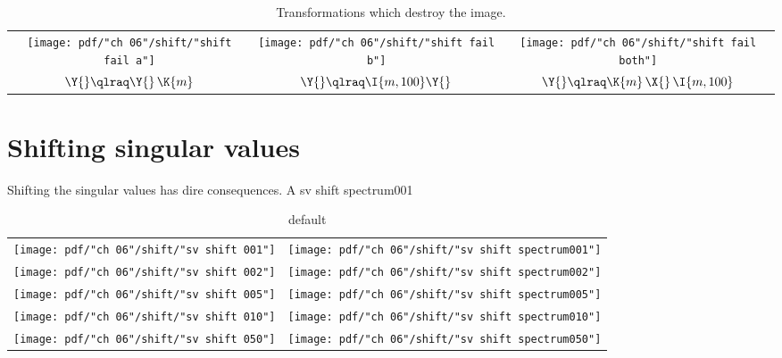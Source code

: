 \clearpage
\break

\begin{landscape}
\thispagestyle{empty}
\begin{table}[htdp]
\begin{center}
\begin{tabular}{ccc}
\texttt{[image: pdf/"ch 06"/shift/"shift fail a"]} &
\texttt{[image: pdf/"ch 06"/shift/"shift fail b"]} &
\texttt{[image: pdf/"ch 06"/shift/"shift fail both"]} \\
$\Y{} \qlraq \Y{}\,\K{m}$ &
$\Y{} \qlraq \I{m,100}\Y{}$ &
$\Y{} \qlraq \K{m}\,\X{}\,\I{m,100}$\\[5pt]
\end{tabular}
\end{center}
\label{tab:Jordan:shift:fail}
\caption[Transformations which destroy the image]{Transformations which destroy the image.}
\end{table}%
\end{landscape}

\section{Shifting singular values}
Shifting the singular values has dire consequences. A 
sv shift spectrum001

\begin{table}[htdp]
\begin{center}
\begin{tabular}{cc}
\texttt{[image: pdf/"ch 06"/shift/"sv shift 001"]} &
\texttt{[image: pdf/"ch 06"/shift/"sv shift spectrum001"]} \\
\texttt{[image: pdf/"ch 06"/shift/"sv shift 002"]} &
\texttt{[image: pdf/"ch 06"/shift/"sv shift spectrum002"]} \\
\texttt{[image: pdf/"ch 06"/shift/"sv shift 005"]} &
\texttt{[image: pdf/"ch 06"/shift/"sv shift spectrum005"]} \\
\texttt{[image: pdf/"ch 06"/shift/"sv shift 010"]} &
\texttt{[image: pdf/"ch 06"/shift/"sv shift spectrum010"]} \\
\texttt{[image: pdf/"ch 06"/shift/"sv shift 050"]} &
\texttt{[image: pdf/"ch 06"/shift/"sv shift spectrum050"]} \\
\end{tabular}
\end{center}
\label{tab:jordan:svshift}
\caption{default}
\end{table}%


